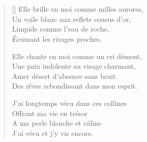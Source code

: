 \section{\hfill}

\settowidth{\versewidth}{Glissant parmi les pierres et dans les cœurs.}
\begin{verse}[\versewidth]
Elle brille en moi comme milles aurores, \\
Un voile blanc aux reflets cousus d'or, \\
Limpide comme l'eau de roche, \\
Écumant les rivages proches.


Elle chante en moi comme un cri dément, \\
Une paix indolente au visage charmant, \\
Amer désert d'absence sans bruit \\
Des rêves rebondissant dans mon esprit.

J'ai longtemps vécu dans ces collines \\
Offrant ma vie en trésor \\
A ma perle blanche et câline \\
J'ai vécu et j'y vis encore.
\end{verse}

\newpage

